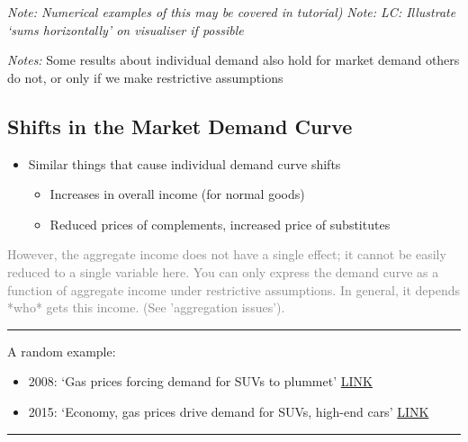 \documentclass[]{article}
\providecommand{\tightlist}{%
  \setlength{\itemsep}{0pt}\setlength{\parskip}{0pt}}
\begin{document}
\emph{Note: Numerical examples of this may be covered in tutorial)}
\emph{Note: LC: Illustrate `sums horizontally' on visualiser if possible}

\emph{Notes:}
Some results about individual demand also hold for market demand
others do not, or only if we make restrictive assumptions

\hypertarget{shifts-in-the-market-demand-curve}{%
\subsection{Shifts in the Market Demand Curve}\label{shifts-in-the-market-demand-curve}}

\begin{itemize}
\tightlist
\item
  Similar things that cause individual demand curve shifts

  \begin{itemize}
  \tightlist
  \item
    Increases in overall income (for normal goods)
  \item
    Reduced prices of complements, increased price of substitutes
  \end{itemize}
\end{itemize}

\textcolor{gray}{However, the aggregate income does not have a single effect; it cannot be easily reduced to a single variable here. You can only express the demand curve as a function of aggregate income under restrictive assumptions. In general, it depends *who* gets this income. (See 'aggregation issues').}

\begin{center}\rule{0.5\linewidth}{\linethickness}\end{center}

A random example:

\begin{itemize}
\item
  2008: `Gas prices forcing demand for SUVs to plummet' \href{http://www.thehour.com/wilton/article/Gas-prices-forcing-demand-for-SUVs-to-plummet-8257785.php}{LINK}
\item
  2015: `Economy, gas prices drive demand for SUVs, high-end cars' \href{http://www.sj-r.com/article/20150809/NEWS/150809569}{LINK}
\end{itemize}

\begin{center}\rule{0.5\linewidth}{\linethickness}\end{center}
\end{document}
